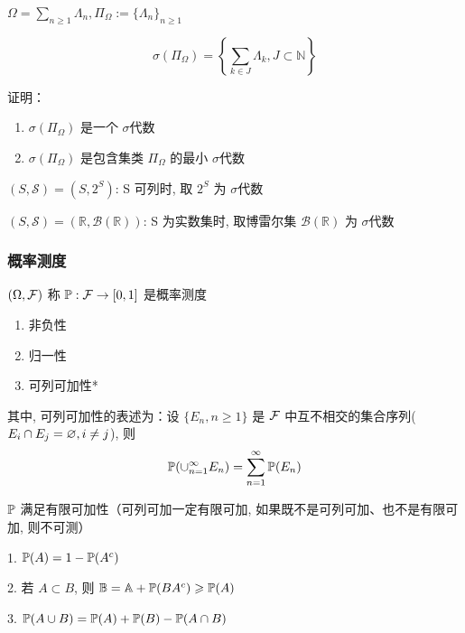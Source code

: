 \begin{example}
    $\Omega=\sum_{n\geq 1}\Lambda_n, \Pi_{\Omega}:=\{\Lambda_n\}_{n\geq 1}$

    \[
    \sigma(\Pi_{\Omega})=\left \{\sum_{k\in J}\Lambda_k, J\subset \mathbb{N}\right \}
    \]
\end{example}

\begin{problem}[作业1-1]
    证明：\begin{enumerate}
        \item $\sigma(\Pi_{\Omega})$ 是一个 $\sigma$代数
        \item $\sigma(\Pi_{\Omega})$ 是包含集类 $\Pi_{\Omega}$ 的最小 $\sigma$代数
    \end{enumerate}
\end{problem}


$(S,\mathcal{S})=(S,2^S)$: S 可列时, 取 $2^S$ 为 $\sigma$代数

$(S,\mathcal{S})=(\mathbb{R},\mathcal{B}(\mathbb{R}))$: S 为实数集时, 取博雷尔集 $\mathcal{B}(\mathbb{R})$ 为 $\sigma$代数


\subsubsection{概率测度}

\begin{definition}[概率测度]\label{def:prob_measure}
    $(\Omega, \mathcal{F})$ 称 $\mathbb{P}: \mathcal{F}\rightarrow [0,1]$ 是概率测度
    \begin{enumerate}
        \item 非负性
        \item 归一性
        \item 可列可加性*
    \end{enumerate}
    其中, 可列可加性的表述为：设 $\{E_n, n\geq 1\}$ 是 $\mathcal{F}$ 中互不相交的集合序列($E_i\cap E_j=\varnothing, i\neq j$), 则
    \[
    \mathbb{P}(\cup_{n=1}^{\infty}E_n)=\sum_{n=1}^{\infty}\mathbb{P}(E_n)
    \]
\end{definition}

\begin{property}
$\mathbb{P}$ 满足有限可加性（可列可加一定有限可加, 如果既不是可列可加、也不是有限可加, 则不可测）
\end{property}

\begin{corollary}\label{cor:set_operation}
    1. $\mathbb{P}(A)=1-\mathbb{P}(A^c)$

    2. 若 $A\subset B$, 则 $\mathbb{B}=\mathbb{A}+\mathbb{P}(BA^c)\geqslant \mathbb{P}(A)$

    3. $\mathbb{P}(A\cup B)=\mathbb{P}(A)+\mathbb{P}(B)-\mathbb{P}(A\cap B)$
\end{corollary}

